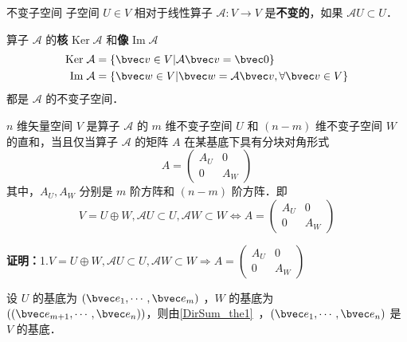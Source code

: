 


\begin{definition}{不变子空间}
子空间 $U\in V$ 相对于线性算子 $\mathcal{A}:V\rightarrow V$ 是\textbf{不变的}，如果 $\mathcal{A}U\subset U$．
\end{definition}
\begin{example}{}
算子 $\mathcal{A}$ 的\textbf{核} $\mathrm{Ker}\;\mathcal A$ 和\textbf{像} $\mathrm{Im}\;\mathcal{A}$
\begin{equation}
\begin{aligned}
\mathrm{Ker}\;\mathcal{A}&=\{\bvec v\in V|\mathcal{A}\bvec v=\bvec 0\}\\
\mathrm{Im}\;\mathcal{A}&=\{\bvec w\in V|\bvec w=\mathcal{A}\bvec v,\forall\bvec v\in V\}
\end{aligned}
\end{equation}
都是 $\mathcal A$ 的不变子空间．
\end{example}
\begin{theorem}{}
$n$ 维矢量空间 $V$ 是算子 $\mathcal{A}$ 的 $m$ 维不变子空间 $U$ 和 $(n-m)$ 维不变子空间 $W$ 的直和，当且仅当算子 $\mathcal{A}$ 的矩阵 $A$ 在某基底下具有分块对角形式
\begin{equation}\label{InvSP_eq1}
A=\begin{pmatrix}
A_U&0\\
0&A_W
\end{pmatrix}
\end{equation}
其中，$A_U,A_W$ 分别是 $m$ 阶方阵和 $(n-m)$ 阶方阵．即
\begin{equation}
V=U\oplus W,\mathcal{A}U\subset U,\mathcal{A}W\subset W\Leftrightarrow A=\begin{pmatrix}
A_U&0\\
0&A_W
\end{pmatrix}
\end{equation}

\end{theorem}
\textbf{证明：}1.$
V=U\oplus W,\mathcal{A}U\subset U,\mathcal{A}W\subset W\Rightarrow A=\begin{pmatrix}
A_U&0\\
0&A_W
\end{pmatrix}
$

设 $U$ 的基底为 $(\bvec e_1,\cdots,\bvec e_m)$ ，$W$ 的基底为 $((\bvec e_{m+1},\cdots,\bvec e_n))$，则由\autoref{DirSum_the1}~，$(\bvec e_{1},\cdots,\bvec e_n)$ 是 $V$ 的基底．

